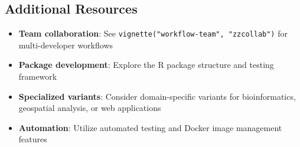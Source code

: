 \documentclass[
]{article}
\providecommand{\tightlist}{%
  \setlength{\itemsep}{0pt}\setlength{\parskip}{0pt}}
\begin{document}
\subsection{Additional Resources}\label{additional-resources}

\begin{itemize}
\tightlist
\item
  \textbf{Team collaboration}: See
  \texttt{vignette("workflow-team",\ "zzcollab")} for multi-developer
  workflows
\item
  \textbf{Package development}: Explore the R package structure and
  testing framework
\item
  \textbf{Specialized variants}: Consider domain-specific variants for
  bioinformatics, geospatial analysis, or web applications
\item
  \textbf{Automation}: Utilize automated testing and Docker image
  management features
\end{itemize}
\end{document}
